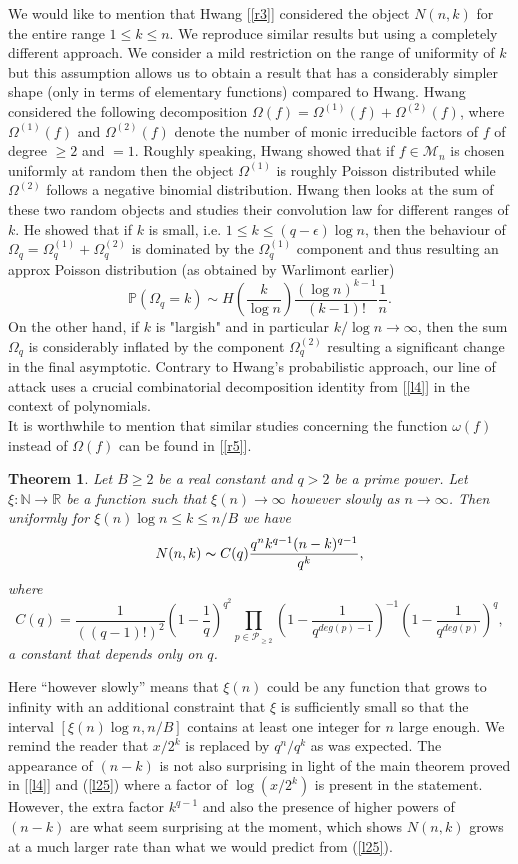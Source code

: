 \documentclass[12pt]{amsart}
\numberwithin{equation}{section}
\newtheorem{theorem}{Theorem}[section]
\theoremstyle{remark}
\theoremstyle{remark}
\theoremstyle{definition}
\begin{document}
We would like to mention that Hwang [\ref{r3}] considered the object $N(n,k)$ for the entire range $1\leqslant k\leqslant n$. We reproduce similar results but using a completely different approach. We consider a mild restriction on the range of uniformity of $k$ but this assumption allows us to obtain a result that has a considerably simpler shape (only in terms of elementary functions) compared to Hwang. Hwang considered the following decomposition $\Omega(f)=\Omega^{(1)}(f)+\Omega^{(2)}(f)$, where $\Omega^{(1)}(f)$ and $\Omega^{(2)}(f)$ denote the number of monic irreducible factors of $f$ of degree $\geqslant 2$ and $=1$. Roughly speaking, Hwang showed that if $f\in\mathcal{M}_n$ is chosen uniformly at random then the object $\Omega^{(1)}$ is roughly Poisson distributed while $\Omega^{(2)}$ follows a negative binomial distribution. Hwang then looks at the sum of these two random objects and studies their convolution law for different ranges of $k$. He showed that if $k$ is small, i.e. $1\leqslant k\leqslant (q-\epsilon)\log n$, then the behaviour of $\Omega_q=\Omega_q^{(1)}+\Omega_q^{(2)}$ is dominated by the $\Omega_q^{(1)}$ component and thus resulting an approx Poisson distribution (as obtained by Warlimont earlier)
$$\mathbb{P}(\Omega_q=k)\sim H\left(\dfrac{k}{\log n}\right)\dfrac{(\log n)^{k-1}}{(k-1)!}\dfrac{1}{n}.$$
On the other hand, if $k$ is "largish" and in particular $k/\log n\to\infty$, then the sum $\Omega_q$ is considerably inflated by the component $\Omega_q^{(2)}$ resulting a significant change in the final asymptotic. Contrary to Hwang's probabilistic approach, our line of attack uses a crucial combinatorial decomposition identity from [\ref{l4}] in the context of polynomials.\\
It is worthwhile to mention that similar studies concerning the function $\omega(f)$ instead of $\Omega(f)$ can be found in [\ref{r5}].
\begin{theorem}\label{l10}
Let $B\geqslant2$ be a real constant and $q>2$ be a prime power. Let $\xi:\mathbb{N}\to\mathbb{R}$ be a function such that $\xi(n)\to\infty$ however slowly as $n\to\infty$. Then uniformly for $\xi(n)\log n\leqslant k\leqslant {n}/{B}$ we have
$$N(n,k) \thicksim C(q)\dfrac{q^nk^{q-1}(n-k)^{q-1}}{q^k},$$
where  \[C(q)=\dfrac{1}{\left((q-1)!\right)^2}\left( 1-\dfrac{1}{q}\right)^{q^2}\displaystyle\prod\limits_{p\in\mathcal{P}_{\geqslant 2}}\left(1-\frac{1}{q^{deg(p)-1}}\right)^{-1}\left( 1-\frac{1}{q^{deg(p)}}\right)^q,\] a constant that depends only on $q$.  
\end{theorem}
Here ``however slowly'' means that $\xi(n)$ could be any function that grows to infinity with an additional constraint that $\xi$ is sufficiently small so that the interval $[\xi(n)\log n,n/B]$ contains at least one integer for $n$ large enough. We remind the reader that $x/2^k$ is replaced by $q^n/q^k$ as was expected. The appearance of $(n-k)$ is not also surprising in light of the main theorem proved in [\ref{l4}] and (\ref{l25}) where a factor of $\log \left(x/2^k\right)$ is present in the statement. However, the extra factor $k^{q-1}$ and also the presence of higher powers of $(n-k)$ are what seem surprising at the moment, which shows $N(n,k)$ grows at a much larger rate than what we would predict from (\ref{l25}).\\
\end{document}
